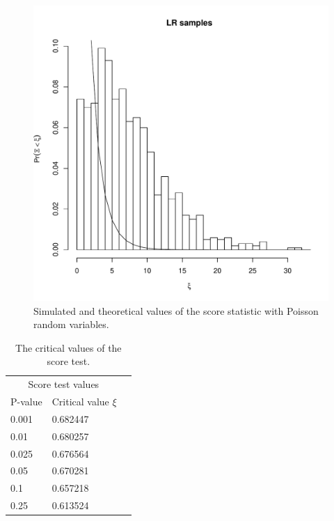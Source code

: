 \documentclass{article}
\begin{document}
\begin{figure}[H]
\label{fig:twice_log_likelihood}
\vspace{0.5in}
\begin{center}
\includegraphics[scale=0.6]{hist.pdf}
\caption{Simulated and theoretical values of the score statistic with Poisson random variables.}
\end{center}
\end{figure}

\begin{table}
\begin{center}
\begin{tabular}{llr}
\hline
\multicolumn{2}{c}{Score test values} \\
\cline{1-2}
P-value & Critical value $\xi$ \\
\hline
0.001 & 0.682447\\
0.01 & 0.680257\\
0.025 &0.676564\\
0.05 &0.670281\\
0.1 &0.657218\\
0.25 &0.613524\\
\hline
\end{tabular}
\end{center}
\caption{The critical values of the score test. }
\label{tab:table1}
\end{table}
\end{document}
